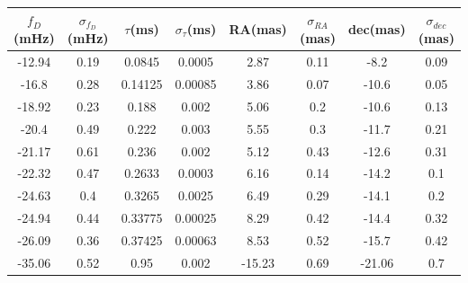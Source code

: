 \documentclass[useAMS,usenatbib]{mn2e}
\begin{document}
\begin{table}
\centering
\label{apex1ms}
\begin{tabular}{|c|c|c|c|c|c|c|c|}
\hline
$f_D$(mHz) & $\sigma_{f_D}$(mHz) & $\tau$(ms) & $\sigma_{\tau}$(ms) & RA(mas) & $\sigma_{RA}$(mas) & dec(mas) & $\sigma_{dec}$(mas) \\
\hline
-12.94                            & 0.19      & 0.0845  & 0.0005          & 2.87    & 0.11                                     & -8.2     & 0.09                                      \\

-16.8                             & 0.28      & 0.14125 & 0.00085         & 3.86    & 0.07                                     & -10.6    & 0.05                                      \\

-18.92                            & 0.23      & 0.188   & 0.002           & 5.06    & 0.2                                      & -10.6    & 0.13                                      \\

-20.4                             & 0.49      & 0.222   & 0.003           & 5.55    & 0.3                                      & -11.7    & 0.21                                      \\

-21.17                            & 0.61      & 0.236   & 0.002           & 5.12    & 0.43                                     & -12.6    & 0.31                                      \\

-22.32                            & 0.47      & 0.2633  & 0.0003          & 6.16    & 0.14                                     & -14.2    & 0.1                                       \\

-24.63                            & 0.4       & 0.3265  & 0.0025          & 6.49    & 0.29                                     & -14.1    & 0.2                                       \\

-24.94                            & 0.44      & 0.33775 & 0.00025         & 8.29    & 0.42                                     & -14.4    & 0.32                                      \\

-26.09                            & 0.36      & 0.37425 & 0.00063         & 8.53    & 0.52                                     & -15.7    & 0.42                                     
\\ \hline 
-35.06                           & 0.52                               & 0.95               & 0.002                              & -15.23  & 0.69                                     & -21.06   & 0.7                                      \\


\end{tabular}
\end{table}
\end{document}
